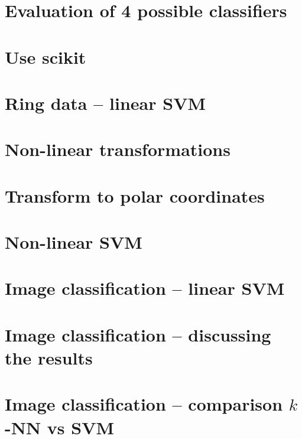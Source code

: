 \documentclass[a4paper,10pt,twoside]{article}
\begin{document}
\section{Evaluation of 4 possible classifiers}

\section{Use scikit}

\section{Ring data -- linear SVM}

\section{Non-linear transformations}

\section{Transform to polar coordinates}

\section{Non-linear SVM}

\section{Image classification -- linear SVM}

\section{Image classification -- discussing the results}

\section{Image classification -- comparison $k$-NN vs SVM}


%
%
\end{document}
